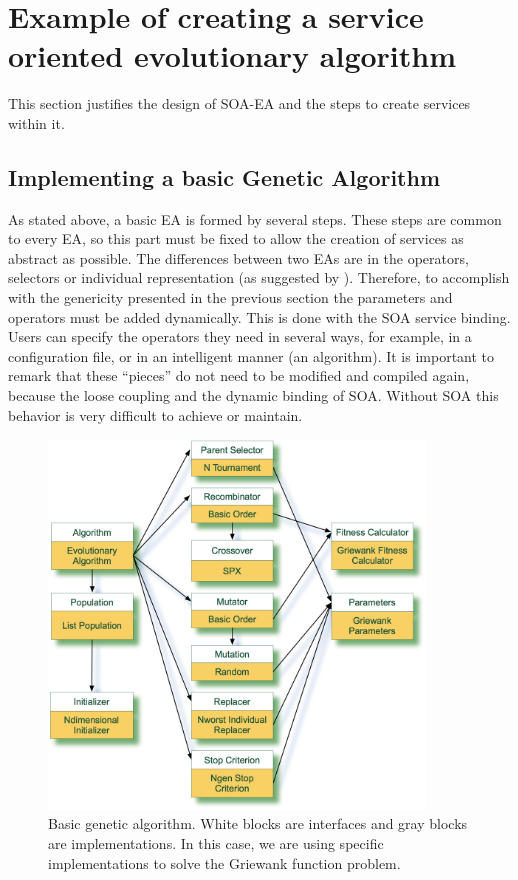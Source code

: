 \section{Example of creating a service oriented evolutionary algorithm}
This section justifies the design of SOA-EA and the steps to create services within it. 
\subsection{Implementing a basic Genetic Algorithm}

As  stated above, a basic EA is formed by several steps. These steps are common to every EA, so this part must be fixed  to allow the creation of services as abstract as possible. The differences between two EAs are in the operators, selectors or individual representation (as suggested by \cite{PARAMETERTUNING11}). Therefore, to accomplish with the genericity presented in the previous section the parameters and operators must be added dynamically. This is done with the SOA service binding. Users can specify the operators they need in several ways, for example, in a configuration file, or in an intelligent manner (an algorithm). It is important to remark that these ``pieces'' do not need to be modified and compiled again, because the loose coupling and the dynamic binding of SOA. Without SOA this behavior is very difficult to achieve or maintain.


\begin{figure}
\centering
\includegraphics[width=10cm]{gfx/soaea/basicga.jpg}
\caption{Basic genetic algorithm. White blocks are interfaces and gray blocks are implementations. In this case, we are using specific implementations to solve the Griewank function problem.}
\label{BASICGAEXAMPLE}
\end{figure}






